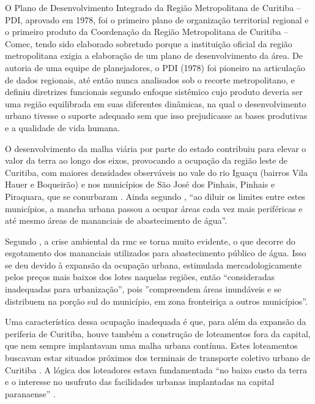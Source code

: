 	\begin{citacao}
		O Plano de Desenvolvimento Integrado da Região Metropolitana de Curitiba – PDI, aprovado em 1978, foi o primeiro plano de organização territorial regional e o primeiro produto da Coordenação da Região Metropolitana de Curitiba – Comec, tendo sido elaborado sobretudo porque a instituição oficial da região metropolitana exigia a elaboração de um plano de desenvolvimento da área. De autoria de uma equipe de planejadores, o PDI (1978) foi pioneiro na articulação de dados regionais, até então nunca analisados sob o recorte metropolitano, e definiu diretrizes funcionais segundo enfoque sistêmico cujo produto deveria ser uma região equilibrada em suas diferentes dinâmicas, na qual o desenvolvimento urbano tivesse o suporte adequado sem que isso prejudicasse as bases produtivas e a qualidade de vida humana.
	\end{citacao}
	
	O desenvolvimento da malha viária por parte do estado contribuiu para elevar o valor da terra ao longo dos eixos, provocando a ocupação da região leste de Curitiba, com maiores densidades observáveis no vale do rio Iguaçu (bairros Vila Hauer e Boqueirão) e nos municípios de São José dos Pinhais, Pinhais e Piraquara, que se conurbaram \cite[p. 54]{castro2005a}. Ainda segundo , ``ao diluir os limites entre estes municípios, a mancha urbana passou a ocupar áreas cada vez mais periféricas e até mesmo áreas de mananciais de abastecimento de água''.
	
	
	Segundo , a crise ambiental da \gls{rmc} se torna muito evidente, o que decorre do esgotamento dos mananciais utilizados para abastecimento público de água. Isso se deu devido à expansão da ocupação urbana, estimulada mercadologicamente pelos preços mais baixos dos lotes naquelas regiões, então ``consideradas inadequadas para urbanização'', pois ''compreendem áreas inundáveis e se distribuem na porção sul do município, em zona fronteiriça a outros municípios''.
	
	Uma característica dessa ocupação inadequada é que, para além da expansão da periferia de Curitiba, houve também a construção de loteamentos fora da capital, que nem sempre implantavam uma malha urbana contínua. Estes loteamentos buscavam estar situados próximos dos terminais de transporte coletivo urbano de Curitiba \cite[p. 138]{lima2001a}. A lógica dos loteadores estava fundamentada ``no baixo custo da terra e o interesse no usufruto das facilidades urbanas implantadas na capital paranaense'' \cite[p. 138]{lima2001a}.
	
